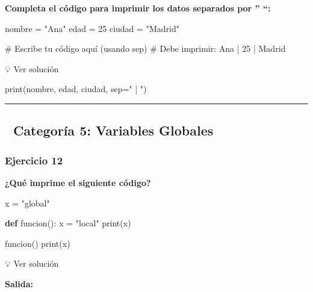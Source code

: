 \documentclass[
  doc,
  floatsintext,
  longtable,
  a4paper,
  nolmodern,
  notxfonts,
  notimes,
  12pt,
  colorlinks=true,linkcolor=blue,citecolor=blue,urlcolor=blue]{apa7}
\newenvironment{Shaded}{\begin{snugshade}}{\end{snugshade}}
\newcommand{\BuiltInTok}[1]{\textcolor[rgb]{0.00,0.23,0.31}{#1}}
\newcommand{\CommentTok}[1]{\textcolor[rgb]{0.37,0.37,0.37}{#1}}
\newcommand{\DecValTok}[1]{\textcolor[rgb]{0.68,0.00,0.00}{#1}}
\newcommand{\KeywordTok}[1]{\textcolor[rgb]{0.00,0.23,0.31}{\textbf{#1}}}
\newcommand{\NormalTok}[1]{\textcolor[rgb]{0.00,0.23,0.31}{#1}}
\newcommand{\OperatorTok}[1]{\textcolor[rgb]{0.37,0.37,0.37}{#1}}
\newcommand{\StringTok}[1]{\textcolor[rgb]{0.13,0.47,0.30}{#1}}
\begin{document}
\textbf{Completa el código para imprimir los datos separados por ''
\textbar{} ``:}

\begin{Shaded}
\begin{Highlighting}[]
\NormalTok{nombre }\OperatorTok{=} \StringTok{"Ana"}
\NormalTok{edad }\OperatorTok{=} \DecValTok{25}
\NormalTok{ciudad }\OperatorTok{=} \StringTok{"Madrid"}

\CommentTok{\# Escribe tu código aquí (usando sep)}
\CommentTok{\# Debe imprimir: Ana | 25 | Madrid}
\end{Highlighting}
\end{Shaded}

💡 Ver solución

\begin{Shaded}
\begin{Highlighting}[]
\BuiltInTok{print}\NormalTok{(nombre, edad, ciudad, sep}\OperatorTok{=}\StringTok{" | "}\NormalTok{)}
\end{Highlighting}
\end{Shaded}

\begin{center}\rule{0.5\linewidth}{0.5pt}\end{center}

\subsection{📌 Categoría 5: Variables
Globales}\label{categoruxeda-5-variables-globales}

\subsubsection{Ejercicio 12}\label{ejercicio-12}

\textbf{¿Qué imprime el siguiente código?}

\begin{Shaded}
\begin{Highlighting}[]
\NormalTok{x }\OperatorTok{=} \StringTok{"global"}

\KeywordTok{def}\NormalTok{ funcion():}
\NormalTok{    x }\OperatorTok{=} \StringTok{"local"}
    \BuiltInTok{print}\NormalTok{(x)}

\NormalTok{funcion()}
\BuiltInTok{print}\NormalTok{(x)}
\end{Highlighting}
\end{Shaded}

💡 Ver solución

\textbf{Salida:}
\end{document}
